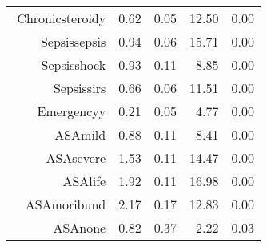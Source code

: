 \begin{tabular}{rrrrr}
$$  Chronic\-steroid\-y & 0.62 & 0.05 & 12.50 & 0.00 \\ 
  Sepsis\-sepsis & 0.94 & 0.06 & 15.71 & 0.00 \\ 
  Sepsis\-shock & 0.93 & 0.11 & 8.85 & 0.00 \\ 
  Sepsis\-sirs & 0.66 & 0.06 & 11.51 & 0.00 \\ 
  Emergency\-y & 0.21 & 0.05 & 4.77 & 0.00 \\ 
  ASA\-mild & 0.88 & 0.11 & 8.41 & 0.00 \\ 
  ASA\-severe & 1.53 & 0.11 & 14.47 & 0.00 \\ 
  ASA\-life & 1.92 & 0.11 & 16.98 & 0.00 \\ 
  ASA\-moribund & 2.17 & 0.17 & 12.83 & 0.00 \\ 
  ASA\-none & 0.82 & 0.37 & 2.22 & 0.03 \\ 
   \hline
\end{tabular}

